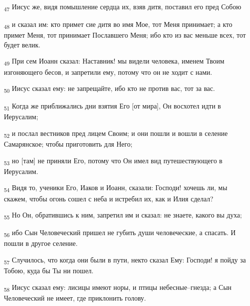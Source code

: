 \begin{tcolorbox}
\textsubscript{47} Иисус же, видя помышление сердца их, взяв дитя, поставил его пред Собою
\end{tcolorbox}
\begin{tcolorbox}
\textsubscript{48} и сказал им: кто примет сие дитя во имя Мое, тот Меня принимает; а кто примет Меня, тот принимает Пославшего Меня; ибо кто из вас меньше всех, тот будет велик.
\end{tcolorbox}
\begin{tcolorbox}
\textsubscript{49} При сем Иоанн сказал: Наставник! мы видели человека, именем Твоим изгоняющего бесов, и запретили ему, потому что он не ходит с нами.
\end{tcolorbox}
\begin{tcolorbox}
\textsubscript{50} Иисус сказал ему: не запрещайте, ибо кто не против вас, тот за вас.
\end{tcolorbox}
\begin{tcolorbox}
\textsubscript{51} Когда же приближались дни взятия Его [от мира], Он восхотел идти в Иерусалим;
\end{tcolorbox}
\begin{tcolorbox}
\textsubscript{52} и послал вестников пред лицем Своим; и они пошли и вошли в селение Самарянское; чтобы приготовить для Него;
\end{tcolorbox}
\begin{tcolorbox}
\textsubscript{53} но [там] не приняли Его, потому что Он имел вид путешествующего в Иерусалим.
\end{tcolorbox}
\begin{tcolorbox}
\textsubscript{54} Видя то, ученики Его, Иаков и Иоанн, сказали: Господи! хочешь ли, мы скажем, чтобы огонь сошел с неба и истребил их, как и Илия сделал?
\end{tcolorbox}
\begin{tcolorbox}
\textsubscript{55} Но Он, обратившись к ним, запретил им и сказал: не знаете, какого вы духа;
\end{tcolorbox}
\begin{tcolorbox}
\textsubscript{56} ибо Сын Человеческий пришел не губить души человеческие, а спасать. И пошли в другое селение.
\end{tcolorbox}
\begin{tcolorbox}
\textsubscript{57} Случилось, что когда они были в пути, некто сказал Ему: Господи! я пойду за Тобою, куда бы Ты ни пошел.
\end{tcolorbox}
\begin{tcolorbox}
\textsubscript{58} Иисус сказал ему: лисицы имеют норы, и птицы небесные--гнезда; а Сын Человеческий не имеет, где приклонить голову.
\end{tcolorbox}
